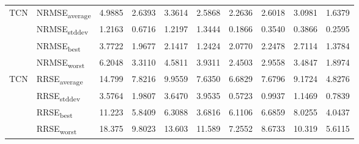 {\begin{longtable}{l l c c c c c c c c}
\cmidrule(lr){2-10}
\multirow{4}{*}{TCN} & NRMSE\textsubscript{average} & 4.9885 & 2.6393 & 3.3614 & 2.5868 & 2.2636 & 2.6018 & 3.0981 & 1.6379 \\
 & NRMSE\textsubscript{stddev} & 1.2163 & 0.6716 & 1.2197 & 1.3444 & 0.1866 & 0.3540 & 0.3866 & 0.2595 \\
 & NRMSE\textsubscript{best} & 3.7722 & 1.9677 & 2.1417 & 1.2424 & 2.0770 & 2.2478 & 2.7114 & 1.3784 \\
 & NRMSE\textsubscript{worst} & 6.2048 & 3.3110 & 4.5811 & 3.9311 & 2.4503 & 2.9558 & 3.4847 & 1.8974 \\
\cmidrule(lr){2-10}
\multirow{4}{*}{TCN} & RRSE\textsubscript{average} & 14.799 & 7.8216 & 9.9559 & 7.6350 & 6.6829 & 7.6796 & 9.1724 & 4.8276 \\
 & RRSE\textsubscript{stddev} & 3.5764 & 1.9807 & 3.6470 & 3.9535 & 0.5723 & 0.9937 & 1.1469 & 0.7839 \\
 & RRSE\textsubscript{best} & 11.223 & 5.8409 & 6.3088 & 3.6816 & 6.1106 & 6.6859 & 8.0255 & 4.0437 \\
 & RRSE\textsubscript{worst} & 18.375 & 9.8023 & 13.603 & 11.589 & 7.2552 & 8.6733 & 10.319 & 5.6115 \\
\cmidrule(lr){2-10}
\end{longtable}
}